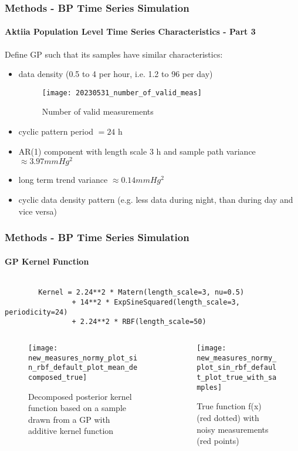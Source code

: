 \documentclass[
	8pt, %
]{beamer}
\begin{document}
\begin{frame}
	\frametitle{Methods - BP Time Series Simulation}
	\framesubtitle{Aktiia Population Level Time Series Characteristics - Part 3}

	Define GP such that its samples have similar characteristics:

	\begin{itemize}
		\item data density (0.5 to 4 per hour, i.e. 1.2 to 96 per day)
		\begin{figure}
			\texttt{[image: 20230531\_number\_of\_valid\_meas]}
			\caption{Number of valid measurements}
		\end{figure}
		\item cyclic pattern period $= 24$ h
		\item AR(1) component with length scale 3 h and sample path variance $\approx 3.97 mmHg^2$
		\item long term trend variance $\approx 0.14 mmHg^2$
		\item cyclic data density pattern (e.g. less data during night, than during day and vice versa)
	\end{itemize}

\end{frame}

\begin{frame}[fragile]
	\frametitle{Methods - BP Time Series Simulation}
	\framesubtitle{GP Kernel Function}

	\begin{verbatim}

		Kernel = 2.24**2 * Matern(length_scale=3, nu=0.5)
				+ 14**2 * ExpSineSquared(length_scale=3, periodicity=24)
				+ 2.24**2 * RBF(length_scale=50)

	\end{verbatim}

	\begin{columns}[c] %
		\begin{column}{0.5\textwidth} %
				\begin{figure}
					\texttt{[image: new\_measures\_normy\_plot\_sin\_rbf\_default\_plot\_mean\_decomposed\_true]}
					\caption{Decomposed posterior kernel function based on a sample drawn from
					a GP with additive kernel function}
				\end{figure}
		\end{column}
		\begin{column}{0.5\textwidth} %
				\begin{figure}
					\texttt{[image: new\_measures\_normy\_plot\_sin\_rbf\_default\_plot\_true\_with\_samples]}
					\caption{True function f(x) (red dotted) with noisy measurements (red points)}
				\end{figure}

		\end{column}
	\end{columns}

\end{frame}
\end{document}
